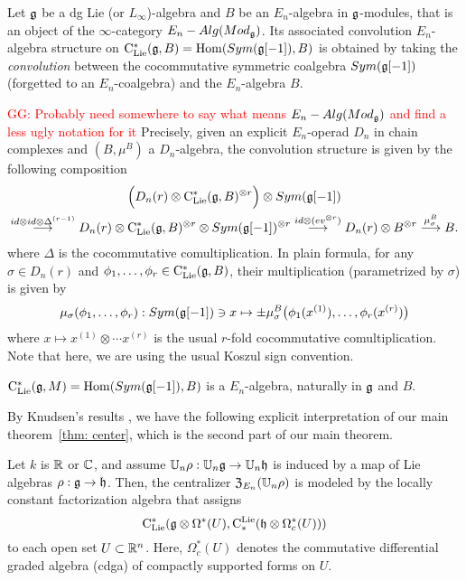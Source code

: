 \documentclass[11pt]{amsart}
\numberwithin{equation}{section}
\def\greg{\textcolor{red}{GG: }\textcolor{red}}
\begin{document}
\begin{dfn}\label{D:convolutionalgebraCE}Let $\mathfrak g$ be a dg Lie (or $L_\infty$)-algebra and $B$ be an $E_n$-algebra in $\mathfrak g$-modules,
that is an object of the $\infty$-category 
$E_n-Alg(Mod_{\mathfrak g})$. Its associated convolution $E_n$-algebra structure on  ${\rm C}_{\rm Lie}^*(\mathfrak g, B) = {\rm Hom} (Sym(\mathfrak g[-1]), B)$ is obtained by 
 taking the \emph{convolution} between the cocommutative symmetric coalgebra $Sym(\mathfrak g[-1])$ (forgetted to an $E_n$-coalgebra) and the $E_n$-algebra $B$.
\end{dfn}
\greg{Probably need somewhere to say what means $E_n-Alg(Mod_{\mathfrak g})$ and find a less ugly notation for it}
Precisely, given an explicit $E_n$-operad $D_n$ in chain complexes and $(B, \mu^B)$ a $D_n$-algebra, 
the convolution structure is given by the following composition
\begin{multline}
 \Big(D_n(r)\otimes {\rm C}_{\rm Lie}^*(\mathfrak g, B)^{\otimes r} \Big)\otimes Sym(\mathfrak g[-1])\\ \stackrel{id\otimes id \otimes\Delta^{(r-1)}}\longrightarrow 
 D_n(r)\otimes {\rm C}_{\rm Lie}^*(\mathfrak g, B)^{\otimes r} \otimes Sym(\mathfrak g[-1])^{\otimes r} 
 \stackrel{id \otimes (ev^{\otimes r})}\longrightarrow D_n(r)\otimes B^{\otimes r} 
 \stackrel{\mu_\sigma^B}\longrightarrow B.
\end{multline}
where $\Delta$ is the cocommutative comultiplication.
In plain formula,
for any $\sigma \in D_n(r)$ and $\phi_1,\dots, \phi_r \in 
{\rm C}_{\rm Lie}^*(\mathfrak g, B)$, their multiplication (parametrized by $\sigma$) is  given by 
\begin{equation}
 \mu_\sigma (\phi_1,\dots, \phi_r): Sym(\mathfrak g[-1]) \ni x \mapsto \pm \mu^B_{\sigma} \big(\phi_1(x^{(1)}), \dots, \phi_r(x^{(r)})\big)
\end{equation}
where $x\mapsto x^{(1)}\otimes \cdots x^{(r)}$ is the usual $r$-fold cocommutative comultiplication.
Note that here, we are using the usual Koszul sign  convention. 

\begin{lmm}
 ${\rm C}_{\rm Lie}^*(\mathfrak g, M) = {\rm Hom} (Sym(\mathfrak g[-1]), B)$ is a $E_n$-algebra, naturally in $\mathfrak g$ and $B$.
\end{lmm}


By Knudsen's results \cite{Knudsen}, we have the following explicit interpretation of our main theorem~\ref{thm: center}, which is the second part of our main theorem.

\begin{cor}\label{cor:centerfactorization}
Let $k$ is $\mathbb R$ or $\mathbb C$, and assume $\mathbb U_n \rho:  \mathbb U_n \mathfrak g \to \mathbb U_n \mathfrak h$ is induced by a map of Lie algebras $\rho: \mathfrak g \to \mathfrak h$. 
Then, the centralizer ${\frak Z}_{E_n}(\mathbb U_n \rho)$ is modeled by the locally constant factorization algebra that assigns
\[
{\rm C}_{\rm Lie}^*(\mathfrak g \otimes \Omega^*(U), {\rm C}^{\rm Lie}_*( \mathfrak h \otimes \Omega^*_c(U)))
\]
to each open set $U \subset \mathbb R^n$. Here, $\Omega^*_c(U)$ denotes the commutative differential graded algebra (cdga) of compactly supported forms on $U$.
\end{cor}
\end{document}
